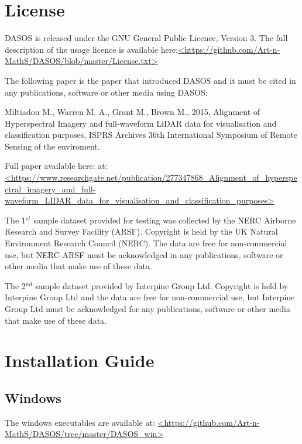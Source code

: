 \documentclass{subfiles}
\begin{document}
		\section{License} \label{License}
		
		\par DASOS is released under the GNU General Public Licence, Version 3. The full description of the usage licence is available here:\url{<https://github.com/Art-n-MathS/DASOS/blob/master/License.txt>}
		
		\par The following paper is the paper that introduced DASOS and it must be cited in any publications, software or other media using DASOS:
		
		Miltiadou M., Warren M. A., Grant M., Brown M., 2015, Alignment of Hyperspectral Imagery and full-waveform LiDAR data for visualisation and classification purposes, ISPRS Archives 36th International Symposium of	Remote Sensing of the enviroment. \cite{Miltiadou2015}
		
		\par Full paper available here: at:\url{<https://www.researchgate.net/publication/277347868_Alignment_of_hyperspectral_imagery_and_full-waveform_LIDAR_data_for_visualisation_and_classification_purposes>}
		
		
		
		\par The 1$^{st}$ sample dataset provided for testing was collected by the NERC Airborne Research and Survey Facility (ARSF). Copyright is held by the UK Natural Environment Research Council (NERC). The data are free for non-commercial use, but NERC-ARSF must be acknowledged in any publications, software or other media that make use of these data.
		
		\par The 2$^{nd}$ sample dataset provided by Interpine Group Ltd. Copyright is held by Interpine Group Ltd and the data are free for non-commercial use, but Interpine Group Ltd must be acknowledged for any publications, software or other media that make use of these data. 
		
		

	
	\section{Installation Guide} \label{Installation}
		\subsection {Windows}
		\par The windows executables are available at: \newline \url{<https://github.com/Art-n-MathS/DASOS/tree/master/DASOS_win>}
		 
\end{document}
